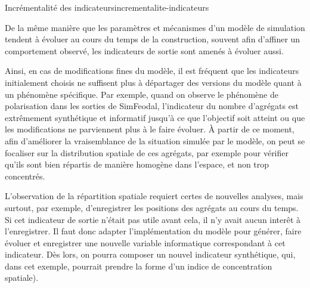 \bigskip

\begin{encadre}{Incrémentalité des indicateurs}{incrementalite-indicateurs}

De la même manière que les paramètres et mécanismes d'un modèle de simulation tendent à évoluer\footnotemark{} au cours du temps de la construction, souvent afin d'affiner un comportement observé, les indicateurs de sortie sont amenés à évoluer aussi.

Ainsi, en cas de modifications fines du modèle, il est fréquent que les indicateurs initialement choisis ne suffisent plus à départager des versions du modèle quant à un phénomène spécifique.
Par exemple, quand on observe le phénomène de polarisation dans les sorties de SimFeodal, l'indicateur du nombre d'agrégats est extrêmement synthétique et informatif jusqu'à ce que l'objectif soit atteint ou que les modifications ne parviennent plus à le faire évoluer.
À partir de ce moment, afin d'améliorer la vraisemblance de la situation simulée par le modèle, on peut se focaliser sur la distribution spatiale de ces agrégats, par exemple pour vérifier qu'ils sont bien répartis de manière homogène dans l'espace, et non trop concentrés.

L'observation de la répartition spatiale requiert certes de nouvelles analyses, mais surtout, par exemple, d'enregistrer les positions des agrégats au cours du temps.
Si cet indicateur de sortie n'était pas utile avant cela, il n'y avait aucun interêt à l'enregistrer.
Il faut donc adapter l'implémentation du modèle pour générer, faire évoluer et enregistrer une nouvelle variable informatique correspondant à cet indicateur.
Dès lors, on pourra composer un nouvel indicateur synthétique, qui, dans cet exemple, pourrait prendre la forme d'un indice de concentration spatiale).


\end{encadre}
